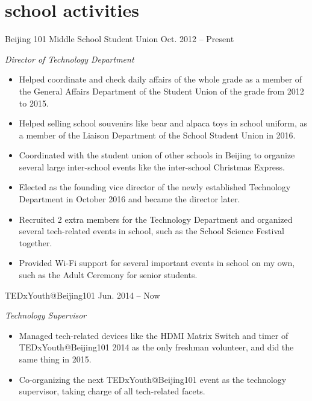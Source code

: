 \documentclass[]{adamyi-cv} %
\begin{document}

\section{school activities}

\begin{entrylist}


\entry
{Beijing 101 Middle School Student Union}
{Oct. 2012 -- Present}
{\emph{Director of Technology Department}
\begin{itemize}
\item Helped coordinate and check daily affairs of the whole grade as a member of the General Affairs Department of the Student Union of the grade from 2012 to 2015.
\item Helped selling school souvenirs like bear and alpaca toys in school uniform, as a member of the Liaison Department of the School Student Union in 2016.
\item Coordinated with the student union of other schools in Beijing to organize several large inter-school events like the inter-school Christmas Express.
\item Elected as the founding vice director of the newly established Technology Department in October 2016 and became the director later.
\item Recruited 2 extra members for the Technology Department and organized several tech-related events in school, such as the School Science Festival together.
\item Provided Wi-Fi support for several important events in school on my own, such as the Adult Ceremony for senior students.
\end{itemize}}


\entry
{TEDxYouth@Beijing101}
{Jun. 2014 -- Now}
{\emph{Technology Supervisor}
\begin{itemize}
\item Managed tech-related devices like the HDMI Matrix Switch and timer of TEDxYouth@Beijing101 2014 as the only freshman volunteer, and did the same thing in 2015.
\item Co-organizing the next TEDxYouth@Beijing101 event as the technology supervisor, taking charge of all tech-related facets.
\end{itemize}}


\end{entrylist}
\end{document}
